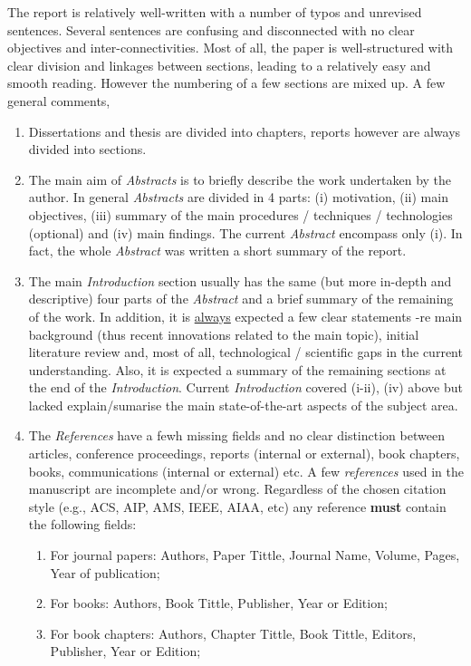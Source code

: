 \documentclass[14pt,twoside]{report}
\begin{document}
The report is relatively well-written with a number of typos and unrevised sentences. Several sentences are confusing and disconnected with no clear objectives and inter-connectivities. Most of all, the paper is well-structured with clear division and linkages between sections, leading to a relatively easy and smooth reading. However the numbering of a few sections are mixed up. A few general comments,
\begin{enumerate}
%
\item Dissertations and thesis are divided into chapters, reports however are always divided into sections. 
%
\item The main aim of {\it Abstracts} is to briefly describe the work undertaken by the author. In general {\it Abstracts} are divided in 4 parts: (i) motivation, (ii) main objectives, (iii) summary of the main procedures / techniques / technologies (optional) and (iv) main findings. The current {\it Abstract} encompass only (i). In fact, the whole {\it Abstract} was written a short summary of the report.
%
\item The main {\it Introduction} section usually has the same (but more in-depth and descriptive) four parts of the {\it Abstract} and a brief summary of the remaining of the work. In addition, it is \underline{always} expected a few clear statements -re main background (thus recent innovations related to the main topic), initial literature review and, most of all, technological / scientific gaps in the current understanding. Also, it is expected a summary of the remaining sections at the end of the {\it Introduction}.  Current {\it Introduction} covered (i-ii), (iv) above but lacked explain/sumarise the main state-of-the-art aspects of the subject area.
%
\item The {\it References} have  a fewh missing fields and no clear distinction between articles, conference proceedings, reports (internal or external), book chapters, books, communications (internal or external) etc.  A few {\it references} used in the manuscript are incomplete and/or wrong. Regardless of the chosen citation style (e.g., ACS, AIP, AMS, IEEE, AIAA, etc) any reference {\bf must} contain the following fields: 
\begin{enumerate}
\item For journal papers: Authors, Paper Tittle, Journal Name, Volume, Pages, Year of publication;
\item For books: Authors, Book Tittle, Publisher, Year or Edition;
\item For book chapters: Authors, Chapter Tittle, Book Tittle, Editors, Publisher, Year or Edition;

\end{enumerate}
\end{enumerate}
\end{document}
